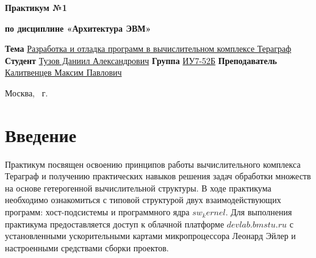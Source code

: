 \documentclass{article}
\begin{document}
\begin{titlepage}
	\noindent\begin{minipage}{1.0\textwidth}\centering
		\Large\textbf{       Практикум №1}
		\end{minipage}
		
	\noindent\begin{minipage}{1.0\textwidth}\centering
		\textbf{\newline}	
		\end{minipage}

	\noindent\begin{minipage}{1.0\textwidth}\centering
		\Large\textbf{по дисциплине «Архитектура ЭВМ»}	
		\end{minipage}
		
	\noindent\begin{minipage}{1.0\textwidth}\centering
		\Large\textbf{\newline\newline\newline\newline}	
		\end{minipage}
	
	\noindent\textbf{Тема} \underline{Разработка и отладка программ в вычислительном комплексе Тераграф}
\newline\newline
	\textbf{Студент} \underline{Тузов Даниил Александрович}\newline\newline
	\textbf{Группа} \underline{ИУ7-52Б}\newline\newline
	\textbf{Преподаватель} \underline{Калитвенцев Максим Павлович}
	
	\begin{center}
		\vfill
		Москва, \the\year ~г.
	\end{center}
	\restoregeometry
	\clearpage
\end{titlepage}

\section{Введение}

Практикум посвящен освоению принципов работы вычислительного комплекса Тераграф и получению практических навыков 
решения задач обработки множеств на основе гетерогенной вычислительной структуры. В ходе практикума необходимо 
ознакомиться с типовой структурой двух взаимодействующих программ: хост-подсистемы и программного ядра $sw_kernel$. 
Для выполнения практикума предоставляется доступ к облачной платформе $devlab.bmstu.ru$ с установленными 
ускорительными картами микропроцессора Леонард Эйлер и настроенными средствами сборки проектов.
\end{document}
